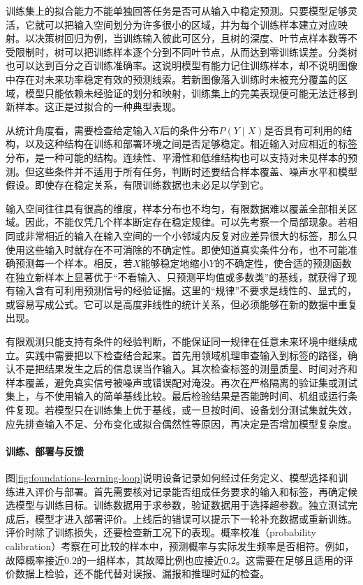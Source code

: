 训练集上的拟合能力不能单独回答任务是否可从输入中稳定预测。只要模型足够灵活，它就可以把输入空间划分为许多很小的区域，并为每个训练样本建立对应映射。以决策树回归为例，当训练输入彼此可区分，且树的深度、叶节点样本数等不受限制时，树可以把训练样本逐个分到不同叶节点，从而达到零训练误差。分类树也可以达到百分之百训练准确率。这说明模型有能力记住训练样本，却不说明图像中存在对未来功率稳定有效的预测线索。若新图像落入训练时未被充分覆盖的区域，模型只能依赖未经验证的划分和映射，训练集上的完美表现便可能无法迁移到新样本。这正是过拟合的一种典型表现。

从统计角度看，需要检查给定输入$X$后的条件分布$P(Y\mid X)$是否具有可利用的结构，以及这种结构在训练和部署环境之间是否足够稳定。相近输入对应相近的标签分布，是一种可能的结构。连续性、平滑性和低维结构也可以支持对未见样本的预测。但这些条件并不适用于所有任务，判断时还要结合样本覆盖、噪声水平和模型假设。即使存在稳定关系，有限训练数据也未必足以学到它。

输入空间往往具有很高的维度，样本分布也不均匀，有限数据难以覆盖全部相关区域。因此，不能仅凭几个样本断定存在稳定规律。可以先考察一个局部现象。若相同或非常相近的输入在输入空间的一个小邻域内反复对应差异很大的标签，那么只使用这些输入时就存在不可消除的不确定性。即使知道真实条件分布，也不可能准确预测每一个样本。相反，若$X$能够稳定地缩小$Y$的不确定性，使合适的预测函数在独立新样本上显著优于“不看输入、只预测平均值或多数类”的基线，就获得了现有输入含有可利用预测信号的经验证据。这里的“规律”不要求是线性的、显式的，或容易写成公式。它可以是高度非线性的统计关系，但必须能够在新的数据中重复出现。

有限观测只能支持有条件的经验判断，不能保证同一规律在任意未来环境中继续成立。实践中需要把以下检查结合起来。首先用领域机理审查输入到标签的路径，确认不是把结果发生之后的信息误当作输入。其次检查标签的测量质量、时间对齐和样本覆盖，避免真实信号被噪声或错误配对淹没。再次在严格隔离的验证集或测试集上，与不使用输入的简单基线比较。最后检验结果是否能跨时间、机组或运行条件复现。若模型只在训练集上优于基线，或一旦按时间、设备划分测试集就失效，应先排查输入不足、分布变化或拟合偶然性等原因，再决定是否增加模型复杂度。

\paragraph{训练、部署与反馈}
图\ref{fig:foundations-learning-loop}说明设备记录如何经过任务定义、模型选择和训练进入评价与部署。首先需要核对记录能否组成任务要求的输入和标签，再确定候选模型与训练目标。训练数据用于求参数，验证数据用于选择超参数。独立测试完成后，模型才进入部署评价。上线后的错误可以提示下一轮补充数据或重新训练。评价时除了训练损失，还要检查新工况下的表现。概率校准（probability calibration）考察在可比较的样本中，预测概率与实际发生频率是否相符。例如，故障概率接近$0.2$的一组样本，其故障比例也应接近$0.2$。这需要在足够且适用的评价数据上检验，还不能代替对误报、漏报和推理时延的检查。


